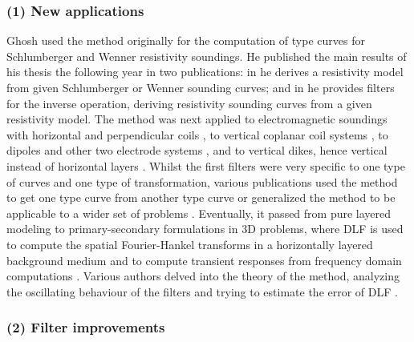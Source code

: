 \documentclass[paper,twocolumn,twoside]{geophysics}
\begin{document}
\subsubsection{(1) New applications}

Ghosh used the method originally for the computation of type curves for
Schlumberger and Wenner resistivity soundings. He published the main results of
his thesis the following year in two publications: in \cite{GP.71.Ghosh} he
derives a resistivity model from given Schlumberger or Wenner sounding curves;
and in \cite{GP.71.Ghoshb} he provides filters for the inverse operation,
deriving resistivity sounding curves from a given resistivity model.  The
method was next applied to electromagnetic soundings with horizontal and
perpendicular coils \citep{GP.72.Koefoed}, to vertical coplanar coil systems
\citep{GP.73.Verma}, to dipoles and other two electrode systems
\citep{GP.74.Das, GP.74.Dasb, GP.80.Das, GEO.94.Sorensen}, and to vertical
dikes, hence vertical instead of horizontal layers \citep{GEO.75.Niwas}. Whilst
the first filters were very specific to one type of curves and one type of
transformation, various publications used the method to get one type curve from
another type curve \citep{GP.77.Kumar, GP.78.Kumar} or generalized the method
to be applicable to a wider set of problems \citep{EXG.80.Davis, GXP.81.Das,
GEO.84.Das, GP.84.ONeill}. Eventually, it passed from pure layered modeling to
primary-secondary formulations in 3D problems, where DLF is used to compute the
spatial Fourier-Hankel transforms in a horizontally layered background medium
and to compute transient responses from frequency domain computations
\citep{GJI.81.Das, GJI.82.Das, GEO.84.Anderson, GEO.86.Newman,
MGS.17.Kruglyakov}. Various authors delved into the theory of the method,
analyzing the oscillating behaviour of the filters and trying to estimate the
error of DLF \citep{GP.72.Koefoedb, GP.76.Koefoedb, GP.79.Johansen,
GP.90.Christensen}.

\subsubsection{(2) Filter improvements}
\end{document}
